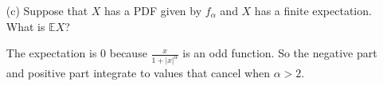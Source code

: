 \documentclass{article}
\begin{document}
\begin{itemize}
        \item [(c)] Suppose that $X$ has a PDF given by $f_{\alpha}$ and $X$ has a finite expectation. What is $\mathbb{E}X$? 
            \begin{answer}
                The expectation is $0$ because $\frac{x}{1 + \lvert x \rvert^{\alpha}}$ is an odd function. So the negative part and positive part integrate to values that cancel when $\alpha > 2$.
            \end{answer}
    \end{itemize}
\end{document}
